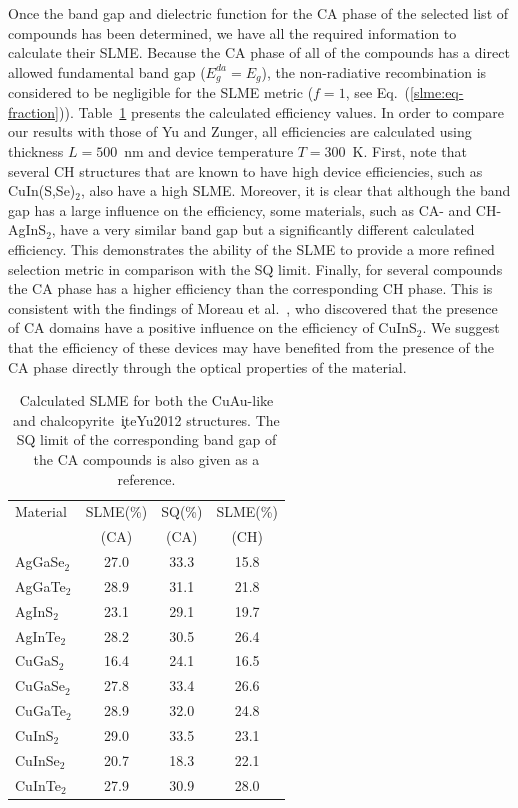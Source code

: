 \begin{refsection}
Once the band gap and dielectric function for the CA phase of 
the selected list of compounds has been determined, we have all the required information to 
calculate their SLME. Because the CA phase of all of the compounds has a direct 
allowed fundamental band gap ($E_g^{da}=E_g$), the non-radiative recombination 
is considered to be negligible for the SLME metric ($f = 1$, see 
Eq.~(\ref{slme:eq-fraction})). Table~\ref{slme:tab-SLME} presents the 
calculated efficiency values.
In order to compare our results with those of Yu 
and Zunger, all efficiencies are calculated using thickness $L = 
500$~\si{\nano\meter} and device temperature \mbox{$T = 300$~\si{\kelvin}}. 
First, note that several CH structures that are known to have high device 
efficiencies, such as CuIn(S,Se)$_{2}$, also have a high SLME. Moreover, it is 
clear that although the band gap has a large influence on the efficiency, some 
materials, such as CA- and \mbox{CH-AgInS$_2$}, have a very similar band gap 
but a significantly different calculated efficiency. This demonstrates the 
ability of the SLME to provide a more refined selection metric in comparison 
with the SQ limit. Finally, for several compounds the CA phase 
has a higher efficiency than the corresponding CH phase. This is consistent 
with the findings of Moreau et al.~\cite{Moreau2015}, who discovered that the 
presence of CA domains have a positive influence on the efficiency of 
CuInS$_2$. We suggest that the efficiency of these devices may have benefited 
from the presence of the CA phase directly through the optical properties of 
the material. 

\begin{table}
\centering \vspace*{-1em}
\captionsetup{width=0.45\textwidth}
\renewcommand{\arraystretch}{1.2} 
\caption{Calculated SLME for both the \mbox{CuAu-like} and 
chalcopyrite~\c ite{Yu2012} structures. The SQ limit of the corresponding band 
gap of the CA compounds is also given as a reference.} 
\label{slme:tab-SLME} 
\begin{tabular}{l@{\hskip 1.5em}c@{\hskip 0.8em}c@{\hskip0.8em}c} 
\hline 
Material & SLME(\%) & SQ(\%) & SLME(\%)\\ 
		 &  (CA)	&  (CA) &  (CH)	 \\\hline 
AgGaSe$_2$ & 27.0 & 33.3 & 15.8 \\ 
AgGaTe$_2$ & 28.9 & 31.1 & 21.8 \\ 
AgInS$_2$  & 23.1 & 29.1 & 19.7 \\ 
AgInTe$_2$ & 28.2 & 30.5 & 26.4 \\ 
CuGaS$_2$  & 16.4 & 24.1 & 16.5 \\ 
CuGaSe$_2$ & 27.8 & 33.4 & 26.6 \\ 
CuGaTe$_2$ & 28.9 & 32.0 & 24.8 \\ 
CuInS$_2$  & 29.0 & 33.5 & 23.1 \\ 
CuInSe$_2$ & 20.7 & 18.3 & 22.1 \\ 
CuInTe$_2$ & 27.9 & 30.9 & 28.0 \\ \hline 
\end{tabular} 
\end{table}


\end{refsection}
